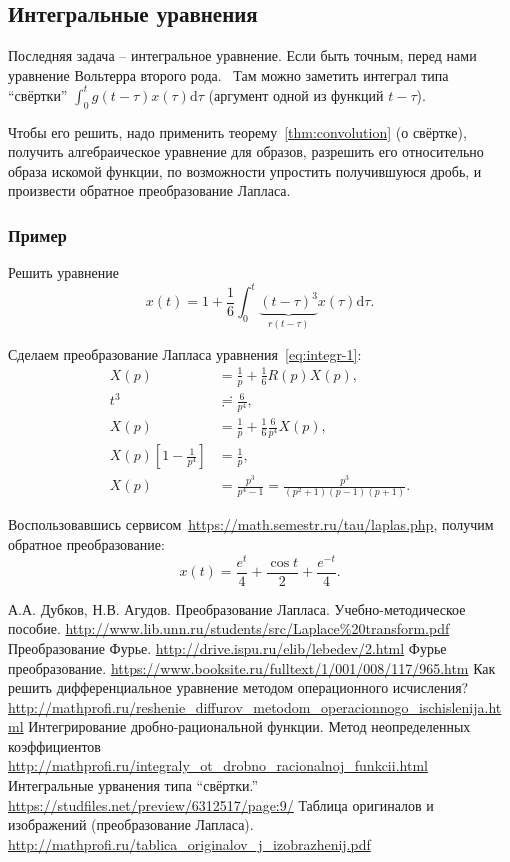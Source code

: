 \documentclass[12pt]{report}
\newcommand{\rd}{\mathrm d}
\begin{document}
\subsection{Интегральные уравнения}
Последняя задача -- интегральное уравнение. Если быть точным, перед нами уравнение Вольтерра второго рода.~\cite[см.~ф-лу~8.11]{integral-equations} Там можно заметить интеграл типа ``свёртки'' $\int_0^t g(t-\tau)x(\tau)\rd\tau$ (аргумент одной из функций $t-\tau$).

Чтобы его решить, надо применить теорему~\ref{thm:convolution} (о свёртке), получить алгебраическое уравнение для образов, разрешить его относительно образа искомой функции, по возможности упростить получившуюся дробь, и произвести обратное преобразование Лапласа.

\subsubsection{Пример}
Решить уравнение
\begin{equation}\label{eq:integr-1}
x(t) = 1 + \frac16\int_0^t \underbrace{(t-\tau)^3}_{r(t-\tau)} x(\tau)\rd\tau. 
\end{equation}

Сделаем преобразование Лапласа уравнения~\eqref{eq:integr-1}:
\begin{align*}
X(p) &= \frac1p + \frac16 R(p)X(p), \\
t^3 &\risingdotseq \frac{6}{p^4}, \\
X(p) &= \frac1p + \frac16\frac{6}{p^4}X(p), \\
X(p)\left[1 - \frac{1}{p^4}\right] &= \frac1p, \\
X(p) &= \frac{p^3}{p^4-1} = \frac{p^3}{(p^2+1)(p-1)(p+1)}.
\end{align*}

Воспользовавшись сервисом~\url{https://math.semestr.ru/tau/laplas.php}, получим обратное преобразование:
\[
x(t) = \frac{e^t}{4} + \frac{\cos t}{2} + \frac{e^{-t}}{4}.
\]


\begin{thebibliography}{0}
	А.А. Дубков, Н.В. Агудов. Преобразование Лапласа. Учебно-методическое пособие.
	\url{http://www.lib.unn.ru/students/src/Laplace%20transform.pdf}
	Преобразование Фурье.
	\url{http://drive.ispu.ru/elib/lebedev/2.html}
	Фурье преобразование.
	\url{https://www.booksite.ru/fulltext/1/001/008/117/965.htm}
	Как решить дифференциальное уравнение
	методом операционного исчисления?
	\url{http://mathprofi.ru/reshenie_diffurov_metodom_operacionnogo_ischislenija.html}
	Интегрирование дробно-рациональной функции. 
	Метод неопределенных коэффициентов
	\url{http://mathprofi.ru/integraly_ot_drobno_racionalnoj_funkcii.html}
	Интегральные урванения типа ``свёртки.''
	\url{https://studfiles.net/preview/6312517/page:9/}
	Таблица оригиналов и изображений (преобразование Лапласа).
	\url{http://mathprofi.ru/tablica_originalov_j_izobrazhenij.pdf}
\end{thebibliography}
\end{document}
